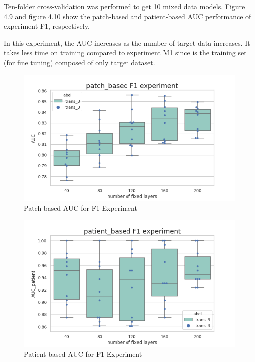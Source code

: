 Ten-folder cross-validation was performed to get 10 mixed data models. Figure 4.9 and figure 4.10 show the patch-based and patient-based AUC performance of experiment F1, respectively. 

In this experiment, the AUC increases as the number of target data increases. It takes less time on training compared to experiment M1 since is the training set (for fine tuning) composed of only target dataset.

\begin{figure}[H]
    \hfil
    \begin{minipage}[t]{0.9\textwidth}
        \includegraphics[width=\textwidth]{fig/F1_num_patch.png}
        \caption{\label{fig:parallel1}Patch-based AUC for F1 Experiment}
    \end{minipage}
    \hfil
\end{figure}
\begin{figure}[H]
    \hfil
    \begin{minipage}[t]{0.9\textwidth}
        \includegraphics[width=\textwidth]{fig/F1_num_patient.png}
        \caption{\label{fig:parallel1} Patient-based AUC for F1 Experiment}
    \end{minipage}
    \hfil
\end{figure}
~\\
